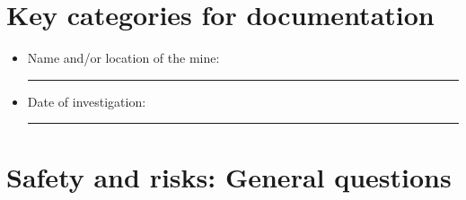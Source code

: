 \documentclass[
  12pt,
]{scrbook}
\begin{document}
\hypertarget{key-categories-for-documentation}{%
\section*{Key categories for documentation}\label{key-categories-for-documentation}}

\begin{itemize}
\item
  Name and/or location of the mine:

  \begin{center}\rule{0.5\linewidth}{0.5pt}\end{center}
\item
  Date of investigation:

  \begin{center}\rule{0.5\linewidth}{0.5pt}\end{center}
\end{itemize}

\hypertarget{safety-and-risks-general-questions}{%
\section*{Safety and risks: General questions}\label{safety-and-risks-general-questions}}
\end{document}
